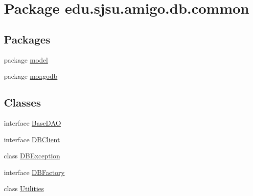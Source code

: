 \hypertarget{namespaceedu_1_1sjsu_1_1amigo_1_1db_1_1common}{}\section{Package edu.\+sjsu.\+amigo.\+db.\+common}
\label{namespaceedu_1_1sjsu_1_1amigo_1_1db_1_1common}
\subsection*{Packages}
\begin{DoxyCompactItemize}
\item 
package \hyperlink{namespaceedu_1_1sjsu_1_1amigo_1_1db_1_1common_1_1model}{model}
\item 
package \hyperlink{namespaceedu_1_1sjsu_1_1amigo_1_1db_1_1common_1_1mongodb}{mongodb}
\end{DoxyCompactItemize}
\subsection*{Classes}
\begin{DoxyCompactItemize}
\item 
interface \hyperlink{interfaceedu_1_1sjsu_1_1amigo_1_1db_1_1common_1_1_base_d_a_o}{Base\+D\+AO}
\item 
interface \hyperlink{interfaceedu_1_1sjsu_1_1amigo_1_1db_1_1common_1_1_d_b_client}{D\+B\+Client}
\item 
class \hyperlink{classedu_1_1sjsu_1_1amigo_1_1db_1_1common_1_1_d_b_exception}{D\+B\+Exception}
\item 
interface \hyperlink{interfaceedu_1_1sjsu_1_1amigo_1_1db_1_1common_1_1_d_b_factory}{D\+B\+Factory}
\item 
class \hyperlink{classedu_1_1sjsu_1_1amigo_1_1db_1_1common_1_1_utilities}{Utilities}
\end{DoxyCompactItemize}
